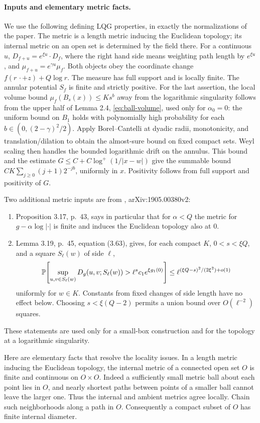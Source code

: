 \documentclass[12pt]{amsart}
\numberwithin{equation}{section}
\begin{document}
\paragraph{Inputs and elementary metric facts.}
We use the following defining LQG properties, in exactly the
normalizations of the paper. The metric is a length metric
inducing the Euclidean topology; its internal metric on an open
set is determined by the field there. For a continuous $u$,
$D_{f+u}=e^{\xi u}\cdot D_f$, where the right hand side means
weighting path length by $e^{\xi u}$, and
$\mu_{f+u}=e^{\gamma u}\mu_f$. Both objects obey the coordinate
change $f(r\,\cdot+z)+Q\log r$. The measure has full support and
is locally finite. The annular potential $S_f$ is finite and
strictly positive. For the last assertion, the local volume
bound $\mu_f(B_s(x))\le Ks^b$ away from the logarithmic
singularity follows from the upper half of Lemma 2.4,
\eqref{eq:ball-volume}, used only for $\alpha_0=0$:
the uniform bound on $B_1$ holds with polynomially high
probability for each $b\in(0,(2-\gamma)^2/2)$.
Apply Borel--Cantelli at dyadic radii, monotonicity, and
translation/dilation to obtain the almost-sure bound on
fixed compact sets. Weyl scaling then handles the bounded
logarithmic drift on the annulus. This bound and the estimate
$G\le C+C\log^+(1/|x-w|)$ give the summable bound
$CK\sum_{j\ge0}(j+1)2^{-jb}$, uniformly in $x$.
Positivity follows from full support and positivity of $G$.

Two additional metric inputs are from \cite{dubedat2020weak},
arXiv:1905.00380v2:
\begin{enumerate}[label=(\roman*)]
\item Proposition 3.17, p.~43, says in particular that for
$\alpha<Q$ the metric for $g-\alpha\log|\cdot|$ is finite
and induces the Euclidean topology also at $0$.
\item Lemma 3.19, p.~45, equation (3.63), gives, for each compact
$K$, $0<s<\xi Q$, and a square $S_\ell(w)$ of side $\ell$,
\[
 \P\!\left[\sup_{u,v\in S_\ell(w)}
  D_g(u,v;S_\ell(w))>\ell^s c_1 e^{\xi g_1(0)}\right]
 \le \ell^{(\xi Q-s)^2/(2\xi^2)+o(1)}
\]
uniformly for $w\in K$. Constants from fixed changes of side
length have no effect below. Choosing $s<\xi(Q-2)$ permits a
union bound over $O(\ell^{-2})$ squares.
\end{enumerate}
These statements are used only for a small-box construction and
for the topology at a logarithmic singularity.

Here are elementary facts that resolve the locality issues.
In a length metric inducing the Euclidean topology, the internal
metric of a connected open set $O$ is finite and continuous on
$O\times O$. Indeed a sufficiently small metric ball about each
point lies in $O$, and nearly shortest paths between points of
a smaller ball cannot leave the larger one. Thus the internal
and ambient metrics agree locally. Chain such neighborhoods
along a path in $O$. Consequently a compact subset of $O$ has
finite internal diameter.
\end{document}
